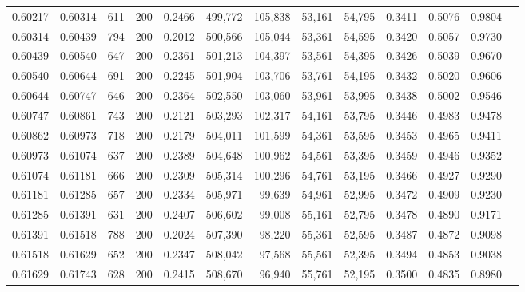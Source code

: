 \begin{tabular}{rrrrrrrrrrrrr}
0.60217 & 0.60314 &    611 & 200 &                                     0.2466 & 499,772 & 105,838 &  53,161 &  54,795 & 0.3411 & 0.5076 & 0.9804 \\
0.60314 & 0.60439 &    794 & 200 &                                     0.2012 & 500,566 & 105,044 &  53,361 &  54,595 & 0.3420 & 0.5057 & 0.9730 \\
0.60439 & 0.60540 &    647 & 200 &                                     0.2361 & 501,213 & 104,397 &  53,561 &  54,395 & 0.3426 & 0.5039 & 0.9670 \\
0.60540 & 0.60644 &    691 & 200 &                                     0.2245 & 501,904 & 103,706 &  53,761 &  54,195 & 0.3432 & 0.5020 & 0.9606 \\
0.60644 & 0.60747 &    646 & 200 &                                     0.2364 & 502,550 & 103,060 &  53,961 &  53,995 & 0.3438 & 0.5002 & 0.9546 \\
0.60747 & 0.60861 &    743 & 200 &                                     0.2121 & 503,293 & 102,317 &  54,161 &  53,795 & 0.3446 & 0.4983 & 0.9478 \\
0.60862 & 0.60973 &    718 & 200 &                                     0.2179 & 504,011 & 101,599 &  54,361 &  53,595 & 0.3453 & 0.4965 & 0.9411 \\
0.60973 & 0.61074 &    637 & 200 &                                     0.2389 & 504,648 & 100,962 &  54,561 &  53,395 & 0.3459 & 0.4946 & 0.9352 \\
0.61074 & 0.61181 &    666 & 200 &                                     0.2309 & 505,314 & 100,296 &  54,761 &  53,195 & 0.3466 & 0.4927 & 0.9290 \\
0.61181 & 0.61285 &    657 & 200 &                                     0.2334 & 505,971 &  99,639 &  54,961 &  52,995 & 0.3472 & 0.4909 & 0.9230 \\
0.61285 & 0.61391 &    631 & 200 &                                     0.2407 & 506,602 &  99,008 &  55,161 &  52,795 & 0.3478 & 0.4890 & 0.9171 \\
0.61391 & 0.61518 &    788 & 200 &                                     0.2024 & 507,390 &  98,220 &  55,361 &  52,595 & 0.3487 & 0.4872 & 0.9098 \\
0.61518 & 0.61629 &    652 & 200 &                                     0.2347 & 508,042 &  97,568 &  55,561 &  52,395 & 0.3494 & 0.4853 & 0.9038 \\
0.61629 & 0.61743 &    628 & 200 &                                     0.2415 & 508,670 &  96,940 &  55,761 &  52,195 & 0.3500 & 0.4835 & 0.8980 \\

\end{tabular}
